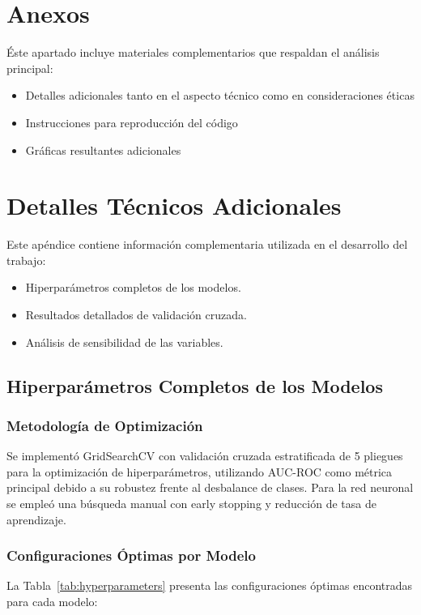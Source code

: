 \documentclass[conference]{IEEEtran}
\begin{document}
\section*{Anexos}

Éste apartado incluye materiales complementarios que respaldan el análisis principal:
\begin{itemize}
    \item Detalles adicionales tanto en el aspecto técnico como en consideraciones éticas
    \item Instrucciones para reproducción del código
    \item Gráficas resultantes adicionales
\end{itemize}

\appendices

\section{Detalles Técnicos Adicionales}
Este apéndice contiene información complementaria utilizada en el desarrollo del trabajo:
\begin{itemize}
    \item Hiperparámetros completos de los modelos.
    \item Resultados detallados de validación cruzada.
    \item Análisis de sensibilidad de las variables.
\end{itemize}

\subsection{Hiperparámetros Completos de los Modelos}

\subsubsection{Metodología de Optimización}
Se implementó GridSearchCV con validación cruzada estratificada de 5 pliegues para la optimización de hiperparámetros, utilizando AUC-ROC como métrica principal debido a su robustez frente al desbalance de clases. Para la red neuronal se empleó una búsqueda manual con early stopping y reducción de tasa de aprendizaje.

\subsubsection{Configuraciones Óptimas por Modelo}
La Tabla~\ref{tab:hyperparameters} presenta las configuraciones óptimas encontradas para cada modelo:
\end{document}
